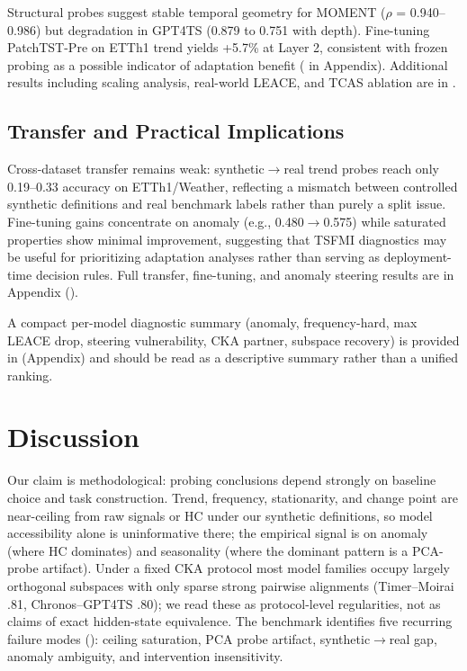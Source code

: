 \documentclass{article}
\begin{document}
Structural probes suggest stable temporal geometry for MOMENT ($\rho$ = 0.940--0.986) but degradation in GPT4TS (0.879 to 0.751 with depth). Fine-tuning PatchTST-Pre on ETTh1 trend yields +5.7\% at Layer 2, consistent with frozen probing as a possible indicator of adaptation benefit ( in Appendix). Additional results including scaling analysis, real-world LEACE, and TCAS ablation are in .

\subsection{Transfer and Practical Implications}

Cross-dataset transfer remains weak: synthetic$\to$real trend probes reach only 0.19--0.33 accuracy on ETTh1/Weather, reflecting a mismatch between controlled synthetic definitions and real benchmark labels rather than purely a split issue. Fine-tuning gains concentrate on anomaly (e.g., 0.480$\to$0.575) while saturated properties show minimal improvement, suggesting that TSFMI diagnostics may be useful for prioritizing adaptation analyses rather than serving as deployment-time decision rules. Full transfer, fine-tuning, and anomaly steering results are in Appendix ().

A compact per-model diagnostic summary (anomaly, frequency-hard, max LEACE drop, steering vulnerability, CKA partner, subspace recovery) is provided in  (Appendix) and should be read as a descriptive summary rather than a unified ranking.

\section{Discussion}

Our claim is methodological: probing conclusions depend strongly on baseline choice and task construction. Trend, frequency, stationarity, and change point are near-ceiling from raw signals or HC under our synthetic definitions, so model accessibility alone is uninformative there; the empirical signal is on anomaly (where HC dominates) and seasonality (where the dominant pattern is a PCA-probe artifact). Under a fixed CKA protocol most model families occupy largely orthogonal subspaces with only sparse strong pairwise alignments (Timer--Moirai .81, Chronos--GPT4TS .80); we read these as protocol-level regularities, not as claims of exact hidden-state equivalence. The benchmark identifies five recurring failure modes (): ceiling saturation, PCA probe artifact, synthetic$\to$real gap, anomaly ambiguity, and intervention insensitivity.
\end{document}
